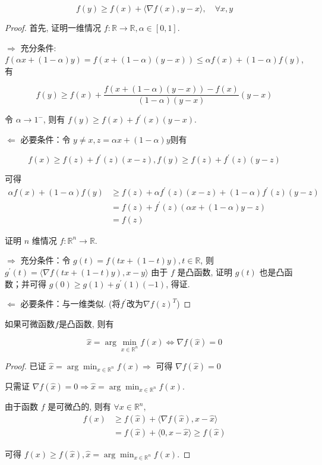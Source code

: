 \begin{theorem}
    \label{Theorem:ConvexDiffential}
    $$ f(y) \geq f(x)+\langle\nabla f(x), y-x\rangle, \quad \forall x, y $$
\end{theorem}

\begin{proof}
    首先, 证明一维情况 $ f: \mathbb{R} \rightarrow \mathbb{R}, \alpha \in[0,1] $.

    $ \Rightarrow  $ 充分条件: $ f(\alpha x+(1-\alpha) y)=f(x+(1-\alpha)(y-x)) \leq \alpha f(x)+(1-\alpha) f(y) $,有

    $$ f(y) \geq f(x)+\frac{f(x+(1-\alpha)(y-x))-f(x)}{(1-\alpha)(y-x)}(y-x) $$

    令 $ \alpha \rightarrow 1^- $, 则有 $ f(y) \geq f(x)+f^{\prime}(x)(y-x) $.

    $ \Leftarrow  $ 必要条件：令 $ y \neq x, z=\alpha x+(1-\alpha) y$则有

    $$  f(x) \geq f(z)+f^{\prime}(z)(x-z), f(y) \geq f(z)+f^{\prime}(z)(y-z)  $$

    可得 
    $$\begin{aligned}
        \alpha f(x)+(1-\alpha) f(y) &\geq f(z)+\alpha f^{\prime}(z)(x-z)+(1-\alpha) f^{\prime}(z)(y-z) \\
        &=f(z)+f^{\prime}(z)(\alpha x+(1-\alpha) y-z) \\
        &=f(z)
    \end{aligned}
    $$

    证明 $ n $ 维情况 $ f: \mathbb{R}^{n} \rightarrow \mathbb{R} $.

    $ \Rightarrow $ 充分条件：令 $ g(t)=f(t x+(1-t) y), t \in \mathbb{R} $, 则 $ g^{\prime}(t)=\langle\nabla f(t x+(1-t) y), x-y\rangle $ 由于 $ f $ 是凸函数, 证明 $ g(t) $ 也是凸函数；并可得 $ g(0) \geq g(1)+g^{\prime}(1)(-1) $, 得证.

    $ \Leftarrow $ 必要条件：与一维类似. (将$f^{\prime}$改为$\nabla f(z)^T$) 
\end{proof}

\begin{theorem}
    如果可微函数$f$是凸函数, 则有

    $$ \hat{x}=\arg \min _{x \in \mathbb{R}^{n}} f(x) \Leftrightarrow \nabla f(\hat{x})=0 $$
\end{theorem}

\begin{proof}
    已证 $ \hat{x}=\arg \min _{x \in \mathbb{R}^{n}} f(x) \Rightarrow $ 可得 $ \nabla f(\hat{x})=0 $

    只需证 $ \nabla f(\hat{x})=0 \Rightarrow \hat{x}=\arg \min _{x \in \mathbb{R}^{n}} f(x) $.

    由于函数 $ f $ 是可微凸的, 则有 $ \forall x \in \mathbb{R}^{n} $,
$$
\begin{aligned}
f(x) & \geq f(\hat{x})+\langle\nabla f(\hat{x}), x-\hat{x}\rangle \\
& = f(\hat{x})+\langle 0, x-\hat{x}\rangle \geq f(\hat{x})
\end{aligned}
$$

可得 $ f(x) \geq f(\hat{x}), \hat{x}=\arg \min _{x \in \mathbb{R}^{n}} f(x) $.
\end{proof}

